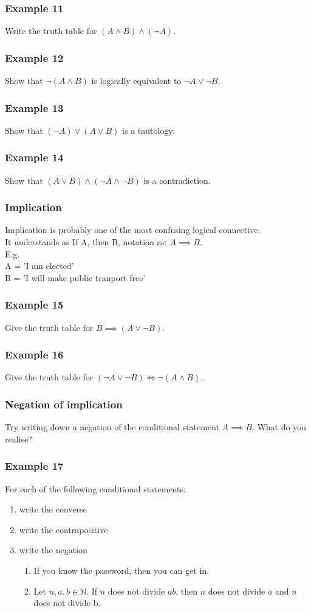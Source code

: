 \documentclass[
	11pt, %
]{beamer}
\begin{document}
\begin{frame}[t]
    \frametitle{Example 11}
    Write the truth table for $(A\land B) \land (\lnot A)$.
\end{frame}

\begin{frame}[t]
    \frametitle{Example 12}
    Show that $\lnot(A \land B)$ is logically equivalent to $\lnot A \lor \lnot B$.
\end{frame}

\begin{frame}[t]
    \frametitle{Example 13}
    Show that $(\lnot A) \lor (A \lor B)$ is a tautology.
\end{frame}

\begin{frame}[t]
    \frametitle{Example 14}
    Show that $(A \lor B) \land (\lnot A \land \lnot B)$ is a contradiction.
\end{frame}

\begin{frame}[t]
    \frametitle{Implication}
    Implication is probably one of the most confusing logical connective.\\
    It understands as If A, then B, notation as: $A \implies B$. \\
    E.g.\\
    A = 'I am elected'\\
    B = 'I will make public tranport free'
\end{frame}

\begin{frame}[t]
    \frametitle{Example 15}
    Give the truth table for $B \implies (A \lor \lnot B)$.
\end{frame}

\begin{frame}[t]
    \frametitle{Example 16}
    Give the truth table for $(\lnot A \lor \lnot B) \iff \lnot (A \land B).$.
\end{frame}

\begin{frame}[t]
    \frametitle{Negation of implication}   
    Try writing down a negation of the conditional statement $A\implies B$. What do you realise?
\end{frame}

\begin{frame}[t]
    \frametitle{Example 17}
    For each of the following conditional statements:
    \begin{enumerate}
        \item write the converse
        \item write the contrapositive
        \item write the negation
        \begin{enumerate}
            \item If you know the password, then you can get in.
            \item Let $n,a,b \in \mathbb{N}$. If $n$ does not divide $ab$, then $n$ does not divide $a$ and $n$ does not divide b.
        \end{enumerate}
    \end{enumerate}
\end{frame}
\end{document}

